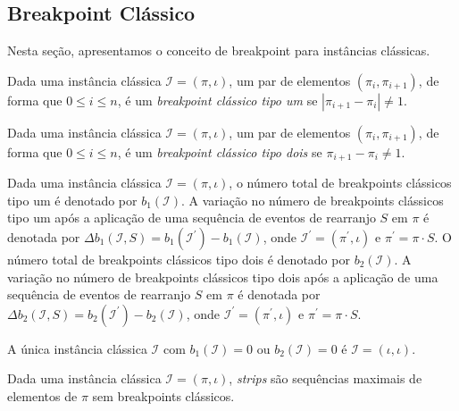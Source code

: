 \subsection{Breakpoint Clássico}

Nesta seção, apresentamos o conceito de breakpoint para instâncias clássicas.

\begin{definition}
  Dada uma instância clássica $\mathcal{I} = (\pi,\iota)$, um par de elementos $(\pi_{i}, \pi_{i+1})$, de forma que $0 \le i \le n$, é um \emph{breakpoint clássico tipo um} se $|\pi_{i+1} - \pi_{i}| \ne 1$.
\end{definition}

\begin{definition}
  Dada uma instância clássica $\mathcal{I} = (\pi,\iota)$, um par de elementos $(\pi_{i}, \pi_{i+1})$, de forma que $0 \le i \le n$, é um \emph{breakpoint clássico tipo dois} se $\pi_{i+1} - \pi_{i} \ne 1$.
\end{definition}

Dada uma instância clássica $\mathcal{I} = (\pi,\iota)$, o número total de breakpoints clássicos tipo um é denotado por $b_{1}(\mathcal{I})$. A variação no número de breakpoints clássicos tipo um após a aplicação de uma sequência de eventos de rearranjo $S$ em $\pi$ é denotada por  $\Delta b_1(\mathcal{I},S) = b_1(\mathcal{I}^{\prime}) - b_1(\mathcal{I})$, onde $\mathcal{I}^{\prime} = (\pi^{\prime},\iota)$ e $\pi^{\prime} = \pi \cdot S$. O número total de breakpoints clássicos tipo dois é denotado por $b_{2}(\mathcal{I})$. A variação no número de breakpoints clássicos tipo dois após a aplicação de uma sequência de eventos de rearranjo $S$ em $\pi$ é denotada por $\Delta b_2(\mathcal{I},S) = b_2(\mathcal{I}^{\prime}) - b_2(\mathcal{I})$, onde $\mathcal{I}^{\prime} = (\pi^{\prime},\iota)$ e $\pi^{\prime} = \pi \cdot S$.

\begin{remark}\label{remark:AEYJTIDG}
  A única instância clássica $\mathcal{I}$ com $b_1(\mathcal{I}) = 0$ ou $b_2(\mathcal{I}) = 0$ é $\mathcal{I} = (\iota,\iota)$.
\end{remark}

\begin{definition}
  Dada uma instância clássica $\mathcal{I} = (\pi,\iota)$, \emph{strips} são sequências maximais de elementos de $\pi$ sem breakpoints clássicos.
\end{definition}

